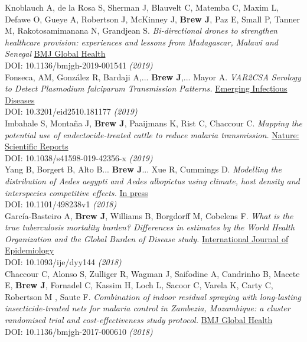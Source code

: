 \documentclass[11pt]{article}
\begin{document}
\noindent Knoblauch A, de la Rosa S, Sherman J, Blauvelt C, Matemba C, Maxim L, Defawe O, Gueye A, Robertson J, McKinney J, \textbf{Brew J}, Paz E, Small P, Tanner M, Rakotosamimanana N, Grandjean S. \emph{Bi-directional drones to strengthen healthcare provision: experiences and lessons from Madagascar, Malawi and Senegal} \href{https://dx.doi.org/10.1136/bmjgh-2019-001541}{BMJ Global Health} \\ DOI: 10.1136/bmjgh-2019-001541 \hfill \emph{(2019)} \\


\noindent Fonseca, AM, González R, Bardaji A,... \textbf{Brew J},... Mayor A. \emph{VAR2CSA Serology to Detect Plasmodium falciparum Transmission Patterns.} \href{https://wwwnc.cdc.gov/eid/article/25/10/18-1177_article}{Emerging Infectious Diseases} \\ DOI: 10.3201/eid2510.181177 \hfill \emph{(2019)} \\  


\noindent Imbahale S, Montaña J, \textbf{Brew J}, Paaijmans K, Rist C, Chaccour C. \emph{Mapping the potential use of endectocide-treated cattle to reduce malaria transmission.} \href{www.nature.com/articles/s41598-019-42356-x}{Nature: Scientific Reports} \\ DOI: 10.1038/s41598-019-42356-x \hfill \emph{(2019)} \\


\noindent Yang B, Borgert B, Alto B... \textbf{Brew J}... Xue R, Cummings D. \emph{Modelling the distribution of Aedes aegypti and Aedes albopictus using climate, host density and interspecies competitive effects.} \href{https://www.biorxiv.org/content/biorxiv/early/2018/12/17/498238.full.pdf}{In press} \\ DOI: 10.1101/498238v1 \hfill \emph{(2018)} \\


\noindent García-Basteiro A, \textbf{Brew J}, Williams B, Borgdorff M, Cobelens F. \emph{What is the true tuberculosis mortality burden? Differences in estimates by the World Health Organization and the Global Burden of Disease study.} \href{https://academic.oup.com/ije/advance-article-abstract/doi/10.1093/ije/dyy144/5053290}{International Journal of Epidemiology} \\ DOI: 10.1093/ije/dyy144 \hfill \emph{(2018)} \\

\noindent Chaccour C, Alonso S, Zulliger R, Wagman J, Saifodine A, Candrinho B, Macete E, \textbf{Brew J}, Fornadel C, Kassim H, Loch L, Sacoor C, Varela K,  Carty C, Robertson  M , Saute F. \emph{Combination of indoor residual spraying with long-lasting insecticide-treated nets for malaria control in Zambezia, Mozambique: a cluster randomised trial and cost-effectiveness study protocol.} \href{http://gh.bmj.com/content/3/1/e000610}{BMJ Global Health} \\ DOI: 10.1136/bmjgh-2017-000610 \hfill \emph{(2018)} \\
\end{document}
